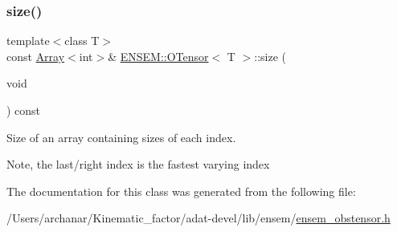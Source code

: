 \subsubsection{\texorpdfstring{size()}{size()}\hspace{0.1cm}{\footnotesize\ttfamily [6/6]}}
{\footnotesize\ttfamily template$<$class T$>$ \\
const \mbox{\hyperlink{classXMLArray_1_1Array}{Array}}$<$int$>$\& \mbox{\hyperlink{classENSEM_1_1OTensor}{E\+N\+S\+E\+M\+::\+O\+Tensor}}$<$ T $>$\+::size (\begin{DoxyParamCaption}\item[{void}]{ }\end{DoxyParamCaption}) const\hspace{0.3cm}{\ttfamily [inline]}}



Size of an array containing sizes of each index. 

Note, the last/right index is the fastest varying index 

The documentation for this class was generated from the following file\+:\begin{DoxyCompactItemize}
\item 
/\+Users/archanar/\+Kinematic\+\_\+factor/adat-\/devel/lib/ensem/\mbox{\hyperlink{adat-devel_2lib_2ensem_2ensem__obstensor_8h}{ensem\+\_\+obstensor.\+h}}\end{DoxyCompactItemize}
